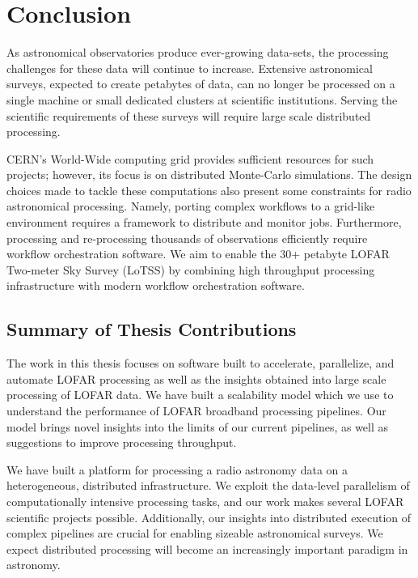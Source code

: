 \chapter{Conclusion}\label{ch:conclusions}


As astronomical observatories produce ever-growing data-sets, the processing challenges for these data will continue  to increase. Extensive astronomical surveys, expected to create petabytes of data, can no longer be processed on a single machine or small dedicated clusters at scientific institutions. Serving the scientific requirements of these surveys will require large scale distributed processing. 

CERN's World-Wide computing grid provides sufficient resources for such projects; however, its focus is on distributed Monte-Carlo simulations. The design choices made to tackle these computations also present some constraints for radio astronomical processing. Namely, porting complex workflows to a grid-like environment requires a framework to distribute and monitor jobs. Furthermore, processing and re-processing thousands of observations efficiently require workflow orchestration software. We aim to enable the 30+ petabyte LOFAR Two-meter Sky Survey (\Gls{LoTSS}) by combining high throughput processing infrastructure with modern workflow orchestration software. 

\section{Summary of Thesis Contributions}

The work in this thesis focuses on software built to accelerate, parallelize, and automate LOFAR processing as well as the insights obtained into large scale processing of LOFAR data. We have built a scalability model which we use to understand the performance of LOFAR broadband processing pipelines. Our model brings novel insights into the limits of our current pipelines, as well as suggestions to improve processing throughput. 

We have built a platform for processing a radio astronomy data on a heterogeneous, distributed infrastructure. We exploit the data-level parallelism of computationally intensive processing tasks, and our work makes several LOFAR scientific projects possible. Additionally, our insights into distributed execution of complex pipelines are crucial for enabling sizeable astronomical surveys. We expect distributed processing will become an increasingly important paradigm in astronomy. 

